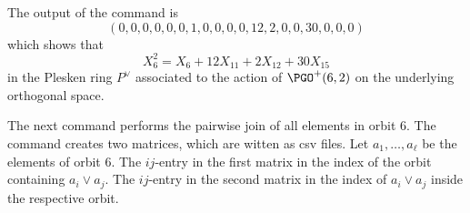
The output of the command is 
$$
( 0, 0, 0, 0, 0, 0, 1, 0, 0, 0, 0, 12, 2, 0, 0, 30, 0, 0, 0 )
$$
which shows that 
$$
X_6^2 = X_6+12X_{11}+2X_{12}+30X_{15}
$$
in the Plesken ring $P^\vee$ associated to the action of $\PGO^+(6,2)$ 
on the underlying orthogonal space. 

\bigskip

The next command performs the pairwise join of all elements in orbit 6. 
The command creates two matrices, which are witten as csv files.
Let $a_1,\ldots,a_\ell$ be the elements of orbit 6. 
The $ij$-entry in the first matrix in the index of the orbit containing $a_i \vee a_j.$
The $ij$-entry in the second matrix in the index of $a_i \vee a_j$ inside the respective orbit.








